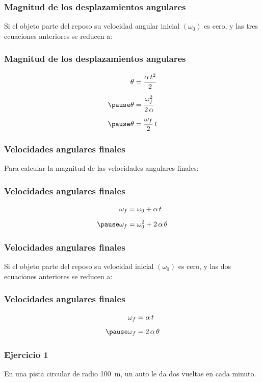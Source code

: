 \documentclass[14pt]{beamer}
\begin{document}
\begin{frame}
\frametitle{Magnitud de los desplazamientos angulares}
Si el objeto parte del reposo su velocidad angular inicial $(\omega_{0})$ es cero, y las tres ecuaciones anteriores se reducen a:
\end{frame}
\begin{frame}
\frametitle{Magnitud de los desplazamientos angulares}
\vspace*{-1cm}
\begin{eqnarray*}
\begin{aligned}
\theta &= \dfrac{\alpha \, t^{2}}{2} \\[0.5em] \pause
\theta &= \dfrac{\omega_{f}^{2}}{2 \, \alpha} \\[0.5em] \pause
\theta &= \dfrac{\omega_{f}}{2} \, t
\end{aligned}
\end{eqnarray*}
\end{frame}
\begin{frame}
\frametitle{Velocidades angulares finales}
Para calcular la magnitud de las velocidades angulares finales:
\end{frame} 
\begin{frame}
\frametitle{Velocidades angulares finales}
\vspace*{-1cm}
\begin{eqnarray*}
\begin{aligned}
\omega_{f} &= \omega_{0} + \alpha \, t \\[0.5em] \pause
\omega_{f} &= \omega_{0}^{2} + 2 \, \alpha \, \theta
\end{aligned}
\end{eqnarray*}
\end{frame}
\begin{frame}
\frametitle{Velocidades angulares finales}
Si el objeto parte del reposo su velocidad inicial $(\omega_{0})$ es cero, y las dos ecuaciones anteriores se reducen a:
\end{frame}
\begin{frame}
\frametitle{Velocidades angulares finales}
\vspace*{-1cm}
\begin{eqnarray*}
\begin{aligned}
\omega_{f} &= \alpha \, t \\[0.5em] \pause
\omega_{f} &= 2 \, \alpha \, \theta
\end{aligned}
\end{eqnarray*}
\end{frame}
\begin{frame}
\frametitle{Ejercicio 1}
En una pista circular de radio \SI{100}{\meter}, un auto le da dos vueltas en cada minuto.
\end{frame}
\end{document}

